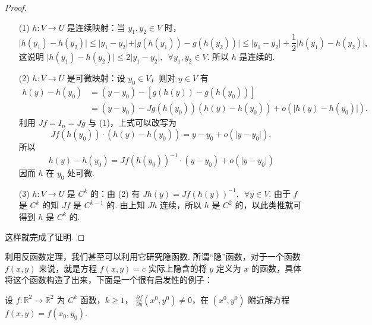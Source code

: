 \begin{proof}
    \begin{enumerate}
        \item[(1)] $h: V\to U$ 是连续映射：当 $y_1,y_2\in V$ 时，\[\vert h(y_1) - h(y_2)\vert \leqslant \vert y_1 - y_2 \vert +\vert g(h(y_1)) - g(h(y_2))\vert \leqslant \vert y_1 - y_2\vert + \frac{1}{2}\vert h(y_1) - h(y_2)\vert,\]
        这说明 $\vert h(y_1) - h(y_2)\vert \leqslant 2\vert y_1 - y_2\vert,\enspace \forall y_1, y_2\in V$. 所以 $h$ 是连续的.
        \item[(2)] $h: V\to U$ 是可微映射：设 $y_0\in V$，则对 $y\in V$ 有
            \[\begin{aligned}
                h(y) - h(y_0) &= (y - y_0) - [g(h(y)) - g(h(y_0))]\\
                &= (y - y_0) - Jg(h(y_0))(h(y) - h(y_0)) + o(\vert h(y) - h(y_0)\vert).
            \end{aligned}\]
            利用 $Jf = I_n = Jg$ 与 (1)，上式可以改写为\[Jf(h(y_0))\cdot(h(y) - h(y_0)) = y - y_0 + o(\vert y - y_0\vert),\]
            所以 \[h(y) - h(y_0) = Jf(h(y_0))^{-1}\cdot(y - y_0) + o(\vert y - y_0\vert)\]
            因而 $h$ 在 $y_0$ 处可微.
        \item[(3)] $h: V\to U$ 是 $C^k$ 的：由 (2) 有 $Jh(y) = Jf(h(y))^{-1},\enspace \forall y\in V$. 由于 $f$ 是 $C^k$ 的知 $Jf$ 是 $C^{k-1}$ 的. 由上知 $Jh$ 连续，所以 $h$ 是 $C^2$ 的，以此类推就可得到 $h$ 是 $C^k$ 的.
    \end{enumerate}

    这样就完成了证明.
\end{proof}

利用反函数定理，我们甚至可以利用它研究隐函数. 所谓“隐”函数，对于一个函数 $f(x, y)$ 来说，就是方程 $f(x, y) = c$ 实际上隐含的将 $y$ 定义为 $x$ 的函数，具体将这个函数构造了出来，下面是一个很有启发性的例子：

\begin{example}{}{}
    设 $f:\mathbb{R}^2\to\mathbb{R}^2$ 为 $C^{k}$ 函数，$k\geqslant 1$， $\frac{\partial f}{\partial y}(x^0, y^0)\neq 0$，在 $(x^0, y^0)$ 附近解方程 $f(x, y) = f(x_0, y_0)$.
\end{example}


